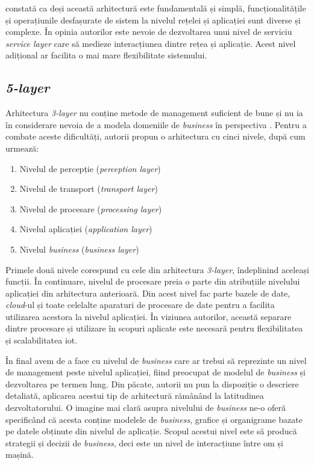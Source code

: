 \cite{Lin2017} constată ca deși această arhitectură este fundamentală și simplă, funcționalitățile și operațiunile desfașurate de sistem la nivelul rețelei și aplicației sunt diverse și complexe. În opinia autorilor este nevoie de dezvoltarea unui nivel de serviciu \textit{service layer} care să medieze interacțiunea dintre rețea și aplicație. Acest nivel adițional ar facilita o mai mare flexibilitate sistemului.

\subsection*{\textit{5-layer}}

Arhitectura \textit{3-layer} nu conține metode de management suficient de bune și nu ia în considerare nevoia de a modela domeniile de \textit{business} în perspectiva \cite{MiaoWu2010}. Pentru a combate aceste dificultăți, autorii propun o arhitectura cu cinci nivele, după cum urmează:

\begin{enumerate}
    \item Nivelul de percepție (\textit{perception layer})
    \item Nivelul de transport (\textit{transport layer})
    \item Nivelul de procesare (\textit{processing layer})
    \item Nivelul aplicației (\textit{application layer})
    \item Nivelul \textit{business} (\textit{business layer})
\end{enumerate}

Primele două nivele corespund cu cele din arhitectura \textit{3-layer}, îndeplinind aceleași funcții. În continuare, nivelul de procesare preia o parte din atribuțiile nivelului aplicației din arhitectura anterioară. Din acest nivel fac parte bazele de date, \textit{cloud}-ul și toate celelalte aparaturi de procesare de date pentru a facilita utilizarea acestora la nivelul aplicației. În viziunea autorilor, această separare dintre procesare și utilizare în scopuri aplicate este necesară pentru flexibilitatea și scalabilitatea \acrshort{iot}.

În final avem de a face cu nivelul de \textit{business} care ar trebui să reprezinte un nivel de management peste nivelul aplicației, fiind preocupat de modelul de \textit{business} și dezvoltarea pe termen lung. Din păcate, autorii nu pun la dispoziție o descriere detaliată, aplicarea acestui tip de arhitectură rămânând la latitudinea dezvoltatorului. O imagine mai clară asupra nivelului de \textit{business} ne-o oferă \cite{Khan2012} specificând că acesta conține modelele de \textit{business}, grafice și organigrame bazate pe datele obținute din nivelul de aplicație. Scopul acestui nivel este să producă strategii și decizii de \textit{business}, deci este un nivel de interacțiune între om și mașină.

